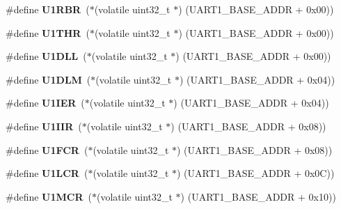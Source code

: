 \begin{DoxyCompactItemize}
\#define {\bfseries U1\+R\+BR}~($\ast$(volatile uint32\+\_\+t $\ast$) (U\+A\+R\+T1\+\_\+\+B\+A\+S\+E\+\_\+\+A\+D\+DR + 0x00))
\item 
\mbox{\label{group__lpc24xx__regs_ga4a778151f5bc729297e22a04beaa2871}} 
\#define {\bfseries U1\+T\+HR}~($\ast$(volatile uint32\+\_\+t $\ast$) (U\+A\+R\+T1\+\_\+\+B\+A\+S\+E\+\_\+\+A\+D\+DR + 0x00))
\item 
\mbox{\label{group__lpc24xx__regs_gaa17272c4fef5bc599e67cbff87278bb2}} 
\#define {\bfseries U1\+D\+LL}~($\ast$(volatile uint32\+\_\+t $\ast$) (U\+A\+R\+T1\+\_\+\+B\+A\+S\+E\+\_\+\+A\+D\+DR + 0x00))
\item 
\mbox{\label{group__lpc24xx__regs_gabe4a266871f6a8000cf8596527411bc4}} 
\#define {\bfseries U1\+D\+LM}~($\ast$(volatile uint32\+\_\+t $\ast$) (U\+A\+R\+T1\+\_\+\+B\+A\+S\+E\+\_\+\+A\+D\+DR + 0x04))
\item 
\mbox{\label{group__lpc24xx__regs_gaa7aca02025c2f7989b49f00235a6f975}} 
\#define {\bfseries U1\+I\+ER}~($\ast$(volatile uint32\+\_\+t $\ast$) (U\+A\+R\+T1\+\_\+\+B\+A\+S\+E\+\_\+\+A\+D\+DR + 0x04))
\item 
\mbox{\label{group__lpc24xx__regs_ga0a289e01382049b15e762fec3acd92a9}} 
\#define {\bfseries U1\+I\+IR}~($\ast$(volatile uint32\+\_\+t $\ast$) (U\+A\+R\+T1\+\_\+\+B\+A\+S\+E\+\_\+\+A\+D\+DR + 0x08))
\item 
\mbox{\label{group__lpc24xx__regs_gae00eb09874ca2de7c69d6e68a1c39b78}} 
\#define {\bfseries U1\+F\+CR}~($\ast$(volatile uint32\+\_\+t $\ast$) (U\+A\+R\+T1\+\_\+\+B\+A\+S\+E\+\_\+\+A\+D\+DR + 0x08))
\item 
\mbox{\label{group__lpc24xx__regs_gade2179d0137cbfe52c8195000c501b64}} 
\#define {\bfseries U1\+L\+CR}~($\ast$(volatile uint32\+\_\+t $\ast$) (U\+A\+R\+T1\+\_\+\+B\+A\+S\+E\+\_\+\+A\+D\+DR + 0x0\+C))
\item 
\mbox{\label{group__lpc24xx__regs_gacd62207fa924ac33cff783dc4795472f}} 
\#define {\bfseries U1\+M\+CR}~($\ast$(volatile uint32\+\_\+t $\ast$) (U\+A\+R\+T1\+\_\+\+B\+A\+S\+E\+\_\+\+A\+D\+DR + 0x10))

\end{DoxyCompactItemize}
